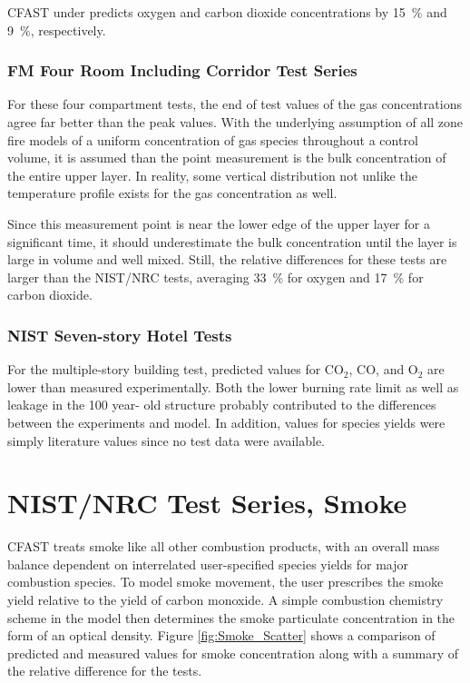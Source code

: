 CFAST under predicts oxygen and carbon dioxide concentrations by 15~\% and 9~\%, respectively.

\subsubsection{FM Four Room Including Corridor Test Series}

For these four compartment tests, the end of test values of the gas concentrations agree far better than the peak values. With the underlying assumption of all zone fire models of a uniform concentration of gas species throughout a control volume,  it is assumed than the point measurement is the bulk concentration of the entire upper layer.  In reality, some vertical distribution not unlike the temperature profile exists for the gas concentration as well. 

Since this measurement point is near the lower edge of the upper layer for a significant time, it 
should underestimate the bulk concentration until the layer is large in volume and well mixed.  Still, the relative differences for these tests are larger than the NIST/NRC tests, averaging 33~\% for oxygen and 17~\% for carbon dioxide.

\subsubsection{NIST Seven-story Hotel Tests}

For the multiple-story building test, predicted values for CO$_2$, CO, and O$_2$ are lower than 
measured experimentally.  Both the lower burning rate limit as well as leakage in the 100 year- 
old structure probably contributed to the differences between the experiments and model.  In 
addition, values for species yields were simply literature values since no test data were available.

\section{NIST/NRC Test Series, Smoke}

CFAST treats smoke like all other combustion products, with an overall mass balance dependent on interrelated user-specified species yields for major combustion species.  To model smoke movement, the user prescribes the smoke yield relative to the yield of carbon monoxide.  A simple combustion chemistry scheme in the model then determines the smoke particulate concentration in the form of an optical density.  Figure \ref{fig:Smoke_Scatter} shows a comparison of predicted and measured values for smoke concentration along with a summary of the relative difference for the tests.

